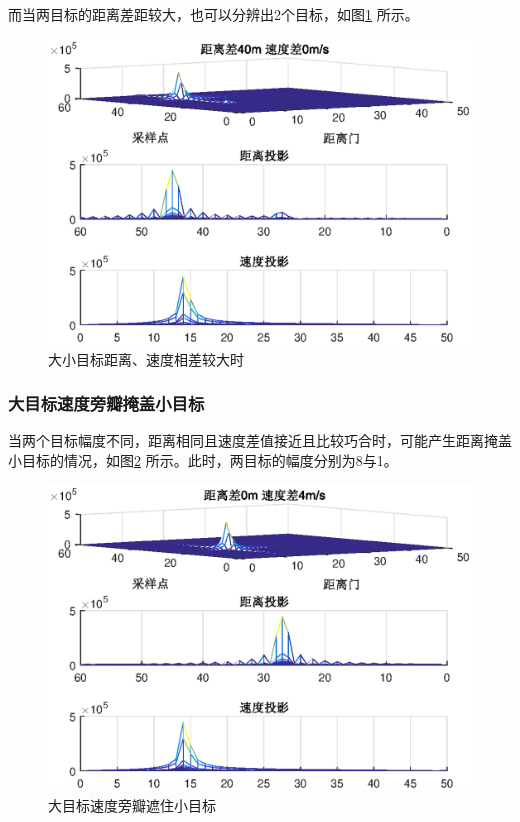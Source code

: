 \documentclass[12pt]{article}
\begin{document}
而当两目标的距离差距较大，也可以分辨出2个目标，如图\ref{zhegai3}
所示。
\begin{figure}[htbp]
  \centering
  \includegraphics[width=\textwidth]{zhegai3}
  \caption{大小目标距离、速度相差较大时}\label{zhegai3}
\end{figure}
\subsubsection{大目标速度旁瓣掩盖小目标}
当两个目标幅度不同，距离相同且速度差值接近且比较巧合时，可能产生距离掩盖小目标的情况，如图\ref{zhegai4}
所示。此时，两目标的幅度分别为8与1。
\begin{figure}[htbp]
  \centering
  \includegraphics[width=\textwidth]{zhegai4}
  \caption{大目标速度旁瓣遮住小目标}\label{zhegai4}
\end{figure}
\end{document}
